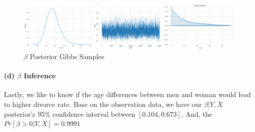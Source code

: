 \documentclass[11pt, letterpaper]{article}
\begin{document}
\begin{figure}[!h]
  \centering
  \includegraphics[width=1.0\textwidth]{6.3.3(2).png}
  \captionsetup{justification=centering}
  \caption{$\beta$ Posterior Gibbs Samples}
\end{figure}

\paragraph{(d) $\beta$ Inference}
Lastly, we like to know if the age differences between men and woman would lead to higher divorce rate. Base on the observation data, we have our $\beta|Y,X$ posterior's 95\% confidence interval between $[0.104, 0.673]$. And, the $Pr[\beta > 0|Y,X] = 0.9991$
\end{document}

